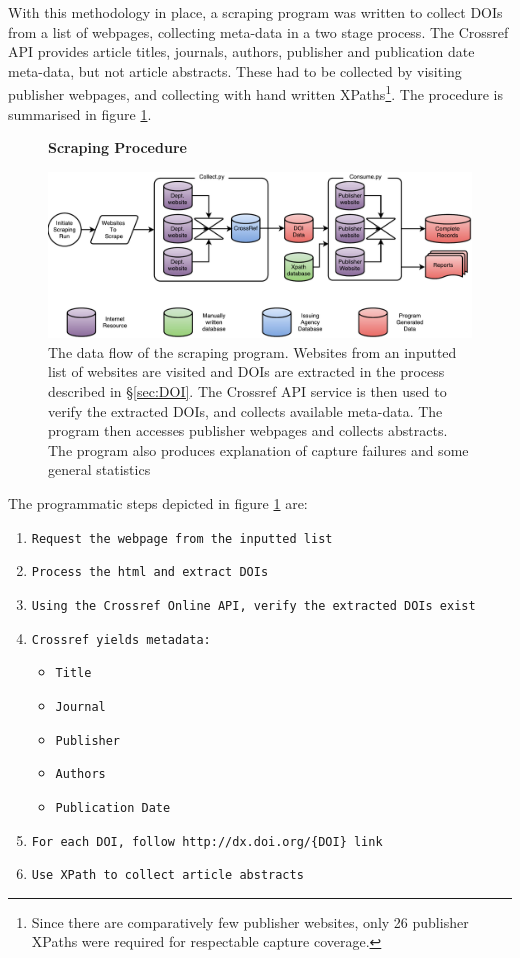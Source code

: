 With this methodology in place, a scraping program was written to collect DOIs from a list of webpages, collecting meta-data in a two stage process. The Crossref API provides article titles, journals, authors, publisher and publication date meta-data, but not article abstracts. These had to be collected by visiting publisher webpages, and collecting with hand written XPaths\footnote{Since there are comparatively few publisher websites, only 26 publisher XPaths were required for respectable capture coverage.}. The procedure is summarised in figure \ref{fig:Cherry}.
\begin{figure}[H]
    \centering
    \textbf{Scraping Procedure}\par\medskip
    \includegraphics[width=\textwidth]{Data_Acquisition/Cherry2.pdf}
    \caption[Data Flow in Scraping Procedure]{The data flow of the scraping program. Websites from an inputted list of websites are visited and DOIs are extracted in the process described in  \S\ref{sec:DOI}. The Crossref API service is then used to verify the extracted DOIs, and collects available meta-data. The program then accesses publisher webpages and collects abstracts. The program also produces explanation of capture failures and some general statistics}
\label{fig:Cherry}
\end{figure}
The programmatic steps depicted in figure \ref{fig:Cherry} are:
\begin{sloppypar}
\begin{enumerate}
\itemsep-0.5em 
\item \texttt{Request the webpage from the inputted list}
\item \texttt{Process the html and extract DOIs}
\item \texttt{Using the Crossref Online API, verify the extracted DOIs exist}
\item \texttt{Crossref yields metadata:}
\begin{itemize}
\itemsep-0.5em 
\item \texttt{Title}
\item \texttt{Journal}
\item \texttt{Publisher}
\item \texttt{Authors}
\item \texttt{Publication Date}
\end{itemize}
\item \texttt{For each DOI,  follow \texttt{http://dx.doi.org/\{DOI\}} link}
\item \texttt{Use XPath to collect article abstracts}
\end{enumerate}
\end{sloppypar}
